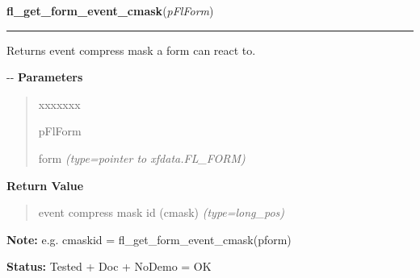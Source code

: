     \vspace{0.5ex}

\hspace{.8\funcindent}\begin{boxedminipage}{\funcwidth}

    \raggedright \textbf{fl\_get\_form\_event\_cmask}(\textit{pFlForm})

    \vspace{-1.5ex}

    \rule{\textwidth}{0.5\fboxrule}
\setlength{\parskip}{2ex}

Returns event compress mask a form can react to.

-{}-
\setlength{\parskip}{1ex}
      \textbf{Parameters}
      \vspace{-1ex}

      \begin{quote}
        \begin{Ventry}{xxxxxxx}

          \item[pFlForm]


form
            {\it (type=pointer to xfdata.FL\_FORM)}

        \end{Ventry}

      \end{quote}

      \textbf{Return Value}
    \vspace{-1ex}

      \begin{quote}

event compress mask id (cmask)
      {\it (type=long\_pos)}

      \end{quote}

\textbf{Note:} 
e.g. cmaskid = fl\_get\_form\_event\_cmask(pform)


\textbf{Status:} 
Tested + Doc + NoDemo = OK


    \end{boxedminipage}

    \label{xformslib:flbasic:fl_set_form_geometry}

    \vspace{0.5ex}

